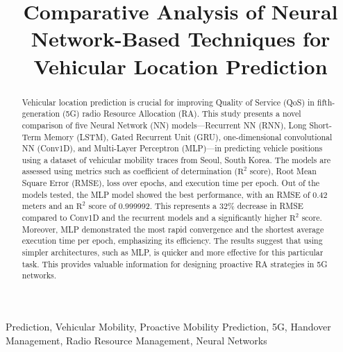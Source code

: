 \documentclass[conference]{IEEEtran}
\begin{document}
\title{Comparative Analysis of Neural Network-Based Techniques for Vehicular Location Prediction}

\author{
}

\maketitle

\begin{abstract}
Vehicular location prediction is crucial for improving Quality of Service (QoS) in fifth-generation (5G) radio Resource Allocation (RA). This study presents a novel comparison of five Neural Network (NN) models—Recurrent NN (RNN), Long Short-Term Memory (LSTM), Gated Recurrent Unit (GRU), one-dimensional convolutional NN (Conv1D), and Multi-Layer Perceptron (MLP)—in predicting vehicle positions using a dataset of vehicular mobility traces from Seoul, South Korea. The models are assessed using metrics such as coefficient of determination ($\text{R}^2$ score), Root Mean Square Error (RMSE), loss over epochs, and execution time per epoch. Out of the models tested, the MLP model showed the best performance, with an RMSE of 0.42 meters and an $\text{R}^2$ score of 0.999992. This represents a 32\% decrease in RMSE compared to Conv1D and the recurrent models and a significantly higher $\text{R}^2$ score. Moreover, MLP demonstrated the most rapid convergence and the shortest average execution time per epoch, emphasizing its efficiency. The results suggest that using simpler architectures, such as MLP, is quicker and more effective for this particular task. This provides valuable information for designing proactive RA strategies in 5G networks.
\end{abstract}

\begin{IEEEkeywords}
Prediction, Vehicular Mobility, Proactive Mobility Prediction, 5G, Handover Management, Radio Resource Management, Neural Networks
\end{IEEEkeywords}
\end{document}
